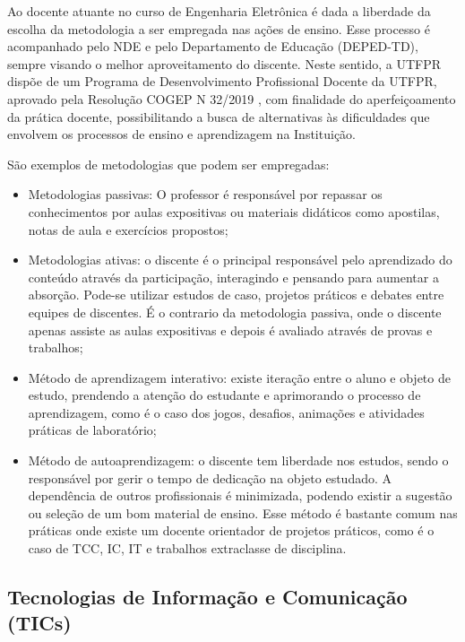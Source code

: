 Ao docente atuante no curso de Engenharia Eletrônica é dada a liberdade da escolha da metodologia a ser empregada nas ações de ensino. Esse processo é acompanhado pelo NDE e pelo Departamento de Educação (DEPED-TD), sempre visando o melhor aproveitamento do discente. Neste sentido, a UTFPR dispõe de um Programa de Desenvolvimento Profissional Docente da UTFPR, aprovado pela Resolução COGEP N\textordmasculine{} 32/2019 \cite{cogep32}, com finalidade do aperfeiçoamento da prática docente, possibilitando a busca de alternativas às dificuldades que envolvem os processos de ensino e aprendizagem na Instituição.

São exemplos de metodologias que podem ser empregadas:

\begin{itemize}
	\item Metodologias passivas: O professor é responsável por repassar os conhecimentos por aulas expositivas ou materiais didáticos como apostilas, notas de aula e exercícios propostos;
	\item Metodologias ativas: o discente é o principal responsável pelo aprendizado do conteúdo através da participação, interagindo e pensando para aumentar a absorção. Pode-se utilizar estudos de caso, projetos práticos e debates entre equipes de discentes. É o contrario da metodologia passiva, onde o discente apenas assiste as aulas expositivas e depois é avaliado através de provas e trabalhos;
	\item Método de aprendizagem interativo: existe iteração entre o aluno e objeto de estudo, prendendo a atenção do estudante e aprimorando o processo de aprendizagem, como é o caso dos jogos, desafios, animações e atividades práticas de laboratório;
	\item Método de autoaprendizagem: o discente tem liberdade nos estudos, sendo o responsável por gerir o tempo de dedicação na objeto estudado. A dependência de outros profissionais é minimizada, podendo existir a sugestão ou seleção de um bom material de ensino. Esse método é bastante comum nas práticas onde existe um docente orientador de projetos práticos, como é o caso de TCC, IC, IT e trabalhos extraclasse de disciplina.
\end{itemize}



\subsection{Tecnologias de Informação e Comunicação (TICs)}

